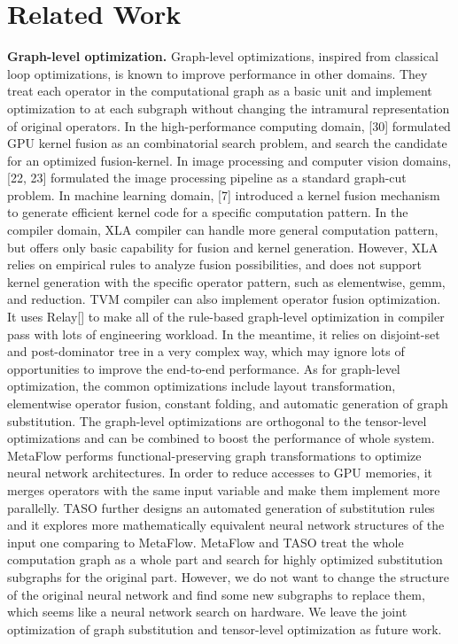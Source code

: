 
\newpage
\section{Related Work}

\textbf{Graph-level optimization.} 
Graph-level optimizations, inspired from classical loop optimizations, is known to improve performance in other domains. They treat each operator in the computational
graph as a basic unit and implement optimization to at each subgraph without changing the intramural representation of original operators. In the high-performance computing domain, [30] formulated GPU kernel fusion as an combinatorial search problem, and search the candidate for an optimized fusion-kernel. In image processing and computer vision 
domains, [22, 23] formulated the image processing pipeline as a standard graph-cut problem. In machine learning domain, [7] introduced a kernel fusion mechanism to
generate efficient kernel code for a specific computation pattern. In the compiler domain, XLA compiler can handle more general computation pattern, but offers
only basic capability for fusion and kernel generation. However, XLA relies on empirical rules to analyze fusion possibilities, and does not support kernel generation 
with the specific operator pattern, such as elementwise, gemm, and reduction. TVM compiler can also implement operator fusion optimization. It uses Relay[] to make 
all of the rule-based graph-level optimization in compiler pass with lots of engineering workload. In the meantime, it relies on disjoint-set and
post-dominator tree in a very complex way, which may ignore lots of opportunities to improve the end-to-end performance. As for graph-level optimization, the common optimizations include layout transformation, elementwise operator fusion, constant folding, and automatic 
generation of graph substitution. The graph-level optimizations are orthogonal to the tensor-level optimizations and can be combined to boost the performance
of whole system. MetaFlow performs functional-preserving graph transformations to optimize neural network architectures. In order to reduce accesses to GPU memories,
it merges operators with the same input variable and make them implement more parallelly. TASO further designs an automated generation of substitution rules and 
it explores more mathematically equivalent neural network structures of the input one comparing to MetaFlow. MetaFlow and TASO treat the whole computation 
graph as a whole part and search for highly optimized substitution subgraphs for the original part. However, we do not want to change the structure of the original
neural network and find some new subgraphs to replace them, which seems like a neural network search on hardware. We leave the joint optimization of graph substitution 
and tensor-level optimization as future work.

